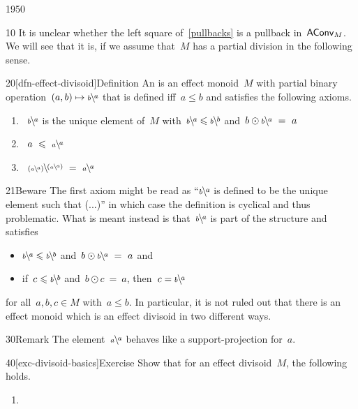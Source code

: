 \begin{parsec}{1950}%
\begin{point}{10}%
It is unclear whether the left square of~\eqref{pullbacks}
    is a pullback in~$\mathsf{AConv}_M$.
We will see that it is, if we assume that~$M$ has
        a partial division in the following sense.
\end{point}
\begin{point}{20}[dfn-effect-divisoid]{Definition}%
An 
    is an effect monoid~$M$
    with partial binary operation~$(a,b) \mapsto \rfrac{a}{b}$
    that is defined iff~$a \leq b$ and
        satisfies the following axioms.
\begin{enumerate}
\item~$\rfrac{a}{b}$
        is the unique element of~$M$
        with~$\rfrac{a}{b} \leq \rfrac{b}{b}$
        and~$b\odot \rfrac{a}{b} \ =\  a$
\item~$a \ \leq \ \rfrac{a}{a}$
\item~$\rfrac{(\rfrac{a}{a})}{(\rfrac{a}{a})} \ =\  \rfrac{a}{a}$
\end{enumerate}
\spacingfix{}
\begin{point}{21}{Beware}%
The first axiom might be read as ``$\rfrac{a}{b}$ is defined to be the
    unique element such that (...)'' in which case the definition
    is cyclical and thus problematic.
    What is meant instead is that~$\rfrac{a}{b}$ is
        part of the structure and satisfies
\begin{itemize}
\item $\rfrac{a}{b} \leq \rfrac{b}{b}$
        and~$b\odot \rfrac{a}{b} \ =\  a$ and
\item
        if~$c \leq \rfrac{b}{b}$
        and~$b\odot c \ =\  a$,
        then~$c = \rfrac{a}{b}$
\end{itemize}
for all~$a,b,c \in M$ with~$a\leq b$.
In particular, it is not ruled out
    that there is an effect monoid
    which is an effect divisoid in two different ways.
\end{point}
\begin{point}{30}{Remark}%
The element~$\rfrac{a}{a}$ behaves like a support-projection for~$a$.
\end{point}
\end{point}
\begin{point}{40}[exc-divisoid-basics]{Exercise}%
Show that for an effect divisoid~$M$, the following holds.
\begin{enumerate}
\item

\end{enumerate}
\end{point}
\end{parsec}

